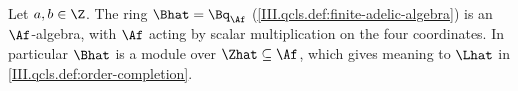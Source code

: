 Let $a,b\in\Z$. The ring $\Bhat=\Bq_{\Af}$ (\cref{III.qcls.def:finite-adelic-algebra}) is an $\Af$-algebra, with $\Af$ acting by scalar multiplication on the four coordinates.
In particular $\Bhat$ is a module over $\Zhat\subseteq\Af$, which gives meaning to $\Lhat$ in \cref{III.qcls.def:order-completion}.
